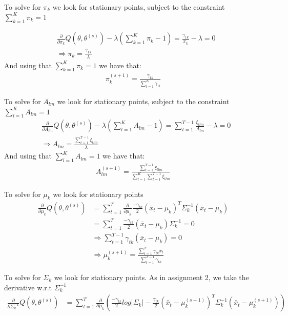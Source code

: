 \documentclass[paper=a4, fontsize=11pt]{scrartcl} %
\numberwithin{equation}{section} %
\numberwithin{figure}{section} %
\numberwithin{table}{section} %
\begin{document}
To solve for \(\pi_k\) we look for stationary points, subject to the constraint \(\sum_{k=1}^K\pi_k = 1\)

\begin{align}
&\frac{\partial}{\partial\pi_k} Q(\theta, \theta^{(s)}) - \lambda \left(\sum_{k=1}^K\pi_k - 1 \right) = \frac{\gamma_{1k}}{\pi_k}-\lambda = 0\\
&\Rightarrow \pi_k = \frac{\gamma_{1k}}{\lambda}
\end{align}
And using that \(\sum_{k=1}^K\pi_k = 1\) we have that:
\begin{align}
\pi_k^{(s+1)} = \frac{\gamma_{1k}}{\sum_{l=1}^K\gamma_{1l}}
\end{align}

To solve for \(A_{lm}\) we look for stationary points, subject to the constraint \(\sum_{l=1}^K A_{lm} = 1\)
\begin{align}
&\frac{\partial}{\partial A_{lm}} Q(\theta, \theta^{(s)}) - \lambda \left(\sum_{l=1}^K A_{lm} - 1 \right) = \sum_{t=1}^{T-1}\frac{\xi_{tlm}}{A_{lm}}-\lambda = 0\\
&\Rightarrow A_{lm} = \frac{\sum_{t=1}^{T-1}\xi_{tlm}}{\lambda}
\end{align}
And using that \(\sum_{l=1}^K A_{lm} = 1\) we have that:
\begin{align}
A_{lm}^{(s+1)} = \frac{\sum_{t=1}^{T-1}\xi_{tlm}}{\sum_{l=1}^K\sum_{t=1}^{T-1}\xi_{tlm}}
\end{align}

To solve for \(\mu_k\) we look for stationary points
\begin{align}
\frac{\partial}{\partial \mu_{k}} Q(\theta, \theta^{(s)}) &= \sum_{t=1}^{T}\frac{\partial}{\partial \mu_{k}}\frac{-\gamma_{tk}}{2}(\bar{x}_t-\mu_k)^T\Sigma_k^{-1}(\bar{x}_t-\mu_k) \\
&=\sum_{t=1}^{T}\frac{-\gamma_{tk}}{2}(\bar{x}_t-\mu_k)\Sigma_k^{-1}=0\\
&\Rightarrow \sum_{t=1}^{T-1}\gamma_{tk}(\bar{x}_t-\mu_k)=0\\
&\Rightarrow \mu_k^{(s+1)} = \frac{\sum_{t=1}^{T}\gamma_{tk}\bar{x}_t}{\sum_{t=1}^{T-1}\gamma_{tk}}
\end{align}

To solve for \(\Sigma_k\) we look for stationary points. As in assignment 2, we take the derivative w.r.t \(\Sigma^{-1}_k\)
\begin{align}
\frac{\partial}{\partial \Sigma^{-1}_{k}} Q(\theta, \theta^{(s)}) &= \sum_{t=1}^{T}\frac{\partial}{\partial \mu_{k}}\left(\frac{-\gamma_{tk}}{2}log|\Sigma_k| -\frac{\gamma_{tk}}{2}\left(\bar{x}_t-\mu_k^{(s+1)}\right)^T\Sigma_k^{-1}\left(\bar{x}_t-\mu_k^{(s+1)}\right)\right)
\end{align}
\end{document}
